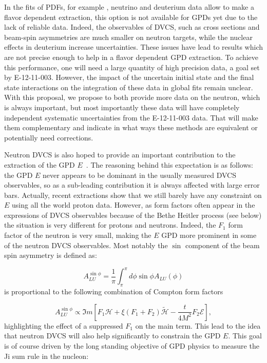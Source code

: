 In the fits of PDFs, for example \cite{Ball:2014uwa} , neutrino and deuterium 
data allow to make a flavor dependent extraction, this option is not available 
for GPDs yet due to the lack of reliable data. Indeed, the observables of DVCS, 
such as cross sections and beam-spin asymmetries are much smaller on neutron 
targets, while the nuclear effects in deuterium increase uncertainties. These 
issues have lead to results \cite{Mazouz:2007aa} which are not precise enough 
to help in a flavor dependent GPD extraction. To achieve this performance, one 
will need a large quantity of high precision data, a goal set by E-12-11-003.  
However, the impact of the uncertain initial state and the final state 
interactions on the integration of these data in global fits remain unclear.  
With this proposal, we propose to both provide more data on the neutron,
which is always important, but most importantly these data will have completely 
independent systematic uncertainties from the E-12-11-003 data. That will make 
them complementary and indicate in what ways these methods are equivalent or 
potentially need corrections.

Neutron DVCS is also hoped to provide an important contribution to the 
extraction of the GPD $E$~\cite{dHose:2016mda}. The reasoning behind this 
expectation is as follows: the GPD $E$ never appears to be dominant in the 
usually measured DVCS observables, so as a sub-leading contribution it is 
always affected with large error bars. Actually, recent extractions 
\cite{Dupre:2017hfs,Moutarde:2018kwr} show that we still barely have any 
constraint on $E$ using all the world proton data. However, as form factors 
often appear in the expressions of DVCS observables because of the Bethe 
Heitler process (see below) the situation is very different for protons and 
neutrons.  Indeed, the $F_1$ form factor of the neutron is very small, making 
the $E$ GPD more prominent in some of the neutron DVCS observables. Most 
notably the $\sin$ component of the beam spin asymmetry is defined as:

\begin{equation}
   A_{LU}^{\sin\phi} = \frac{1}{\pi} \int_{\pi}^{\pi} d\phi \sin\phi 
   A_{LU}(\phi)
\end{equation}
is proportional to the following combination of Compton form 
factors~\cite{Guidal:2013rya}

\begin{equation}
A_{LU}^{\sin\phi} \propto \Im m \left [ F_1 \mathcal{H} + \xi(F_1 + F_2) \mathcal{\tilde H} 
   - \frac{t}{4M^2} F_2  \mathcal{E} \right ],
\end{equation}
highlighting the effect of a suppressed $F_1$ on the main term.
This lead to the idea that neutron DVCS will also help significantly to constrain the 
GPD $E$. This goal is of course driven by the long standing objective of GPD physics to
measure the Ji sum rule in the nucleon:

